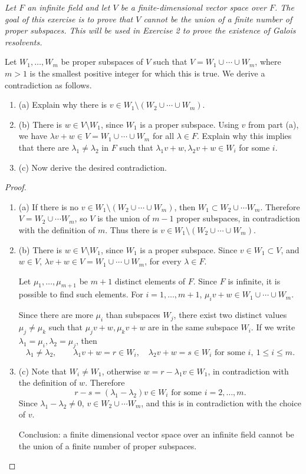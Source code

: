 \documentclass[11pt,a4paper]{article}
\newcommand{\be} {\begin{enumerate}}
\newcommand{\ee} {\end{enumerate}}
\begin{document}
{\it Let $F$ an infinite field and let $V$ be a finite-dimensional vector space over $F$. The goal of this exercise is to prove that $V$ cannot be the union of a finite number of proper subspaces. This will be used in Exercise 2 to prove the existence of Galois resolvents.

Let $W_1,\ldots,W_m$ be proper subspaces of $V$ such that $V = W_1\cup\cdots \cup W_m$, where $m>1$ is the smallest positive integer for which this is true. We derive a contradiction as follows.
\be
\item[(a)] Explain why there is $v \in W_1 \setminus (W_2\cup \cdots \cup W_m)$.
\item[(b)] There is $w \in V\setminus W_1$, since $W_1$ is a proper subspace. Using $v$ from part (a), we have $\lambda v + w \in V = W_1\cup \cdots \cup W_m$ for all $\lambda \in F$. Explain why this implies that there are $\lambda_1 \ne \lambda_2$ in $F$ such that $\lambda_1 v + w, \lambda_2 v + w \in W_i$ for some $i$.
\item[(c)] Now derive the desired contradiction.
\ee
}

\begin{proof}
\be
\item[(a)] If there is no $v \in W_1 \setminus (W_2\cup \cdots \cup W_m)$, then $W_1 \subset W_2\cup \cdots W_m$. Therefore $V = W_2\cup\cdots W_m$, so $V$ is the union of $m-1$ proper subspaces, in contradiction with the definition of $m$. Thus there is $v \in W_1 \setminus (W_2\cup \cdots \cup W_m)$.

\item[(b)] There is $w \in V\setminus W_1$, since $W_1$ is a proper subspace. Since $v \in W_1\subset V$, and $w \in V$, $\lambda v + w \in V = W_1\cup\cdots \cup W_m$, for every $\lambda \in F$.

Let $\mu_1,\ldots,\mu_{m+1}$ be $m+1$ distinct elements of $F$. Since $F$ is infinite, it is possible to find such elements. For $i=1,\ldots,m+1$, $\mu_i v + w \in W_1\cup\cdots \cup W_m$. 

Since there are more $\mu_i$ than subspaces $W_j$, there exist two distinct values $\mu_j \ne \mu_k$ such that $\mu_j v + w, \mu_k v + w$ are in the same subspace $W_i$. If we write $\lambda_1 = \mu_i, \lambda_2 = \mu_j$, then
$$\lambda_1 \ne \lambda_2, \qquad \lambda_1 v + w  = r  \in W_i, \quad  \lambda_2 v + w = s \in W_i \text{ for some } i, \ 1\leq i \leq m.$$

\item[(c)] Note that $W_i \ne W_1$, otherwise $ w = r -\lambda_1 v \in W_1$, in contradiction with the definition of $w$. Therefore
$$r-s = (\lambda_1 - \lambda_2) v \in W_i \text{ for some } i=2,\ldots,m. $$
Since $\lambda_1 - \lambda_2 \ne 0$, $v \in W_2\cup \cdots W_m$, and this is in contradiction with the choice of $v$.

Conclusion: a finite dimensional vector space over an infinite field cannot be the union of a finite number of proper subspaces.
\ee
\end{proof}
\end{document}
